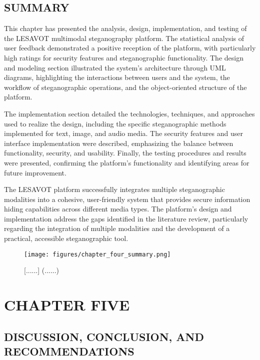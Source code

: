 \documentclass[12pt, a4paper, oneside]{book}
\begin{document}
\section{SUMMARY}

This chapter has presented the analysis, design, implementation, and testing of the LESAVOT multimodal steganography platform. The statistical analysis of user feedback demonstrated a positive reception of the platform, with particularly high ratings for security features and steganographic functionality. The design and modeling section illustrated the system's architecture through UML diagrams, highlighting the interactions between users and the system, the workflow of steganographic operations, and the object-oriented structure of the platform.

The implementation section detailed the technologies, techniques, and approaches used to realize the design, including the specific steganographic methods implemented for text, image, and audio media. The security features and user interface implementation were described, emphasizing the balance between functionality, security, and usability. Finally, the testing procedures and results were presented, confirming the platform's functionality and identifying areas for future improvement.

The LESAVOT platform successfully integrates multiple steganographic modalities into a cohesive, user-friendly system that provides secure information hiding capabilities across different media types. The platform's design and implementation address the gaps identified in the literature review, particularly regarding the integration of multiple modalities and the development of a practical, accessible steganographic tool.

\begin{figure}[htbp]
    \centering
    \texttt{[image: figures/chapter\_four\_summary.png]}
    \caption{[......] (......)}
    \label{fig:chapter_four_summary}
\end{figure}

\chapter{CHAPTER FIVE}

\section{DISCUSSION, CONCLUSION, AND RECOMMENDATIONS}
\end{document}
